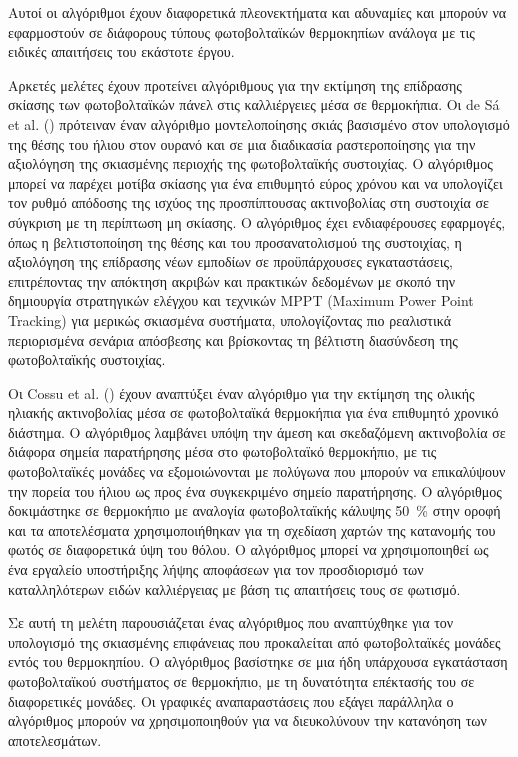 \documentclass[12pt, a4paper]{report} %
\newcommand{\english}{\foreignlanguage{english}}
\begin{document}
\noindent Αυτοί οι αλγόριθμοι έχουν διαφορετικά πλεονεκτήματα και αδυναμίες και μπορούν να εφαρμοστούν σε διάφορους 
τύπους φωτοβολταϊκών θερμοκηπίων ανάλογα με τις ειδικές απαιτήσεις του εκάστοτε έργου.

Αρκετές μελέτες έχουν προτείνει αλγόριθμους για την εκτίμηση της επίδρασης σκίασης των φωτοβολταϊκών πάνελ στις 
καλλιέργειες μέσα σε θερμοκήπια. Οι \english{de Sá et al.} (\citeyear{algorithm_bib9}) πρότειναν έναν αλγόριθμο 
μοντελοποίησης σκιάς βασισμένο στον υπολογισμό της θέσης του ήλιου στον ουρανό και σε μια διαδικασία ραστεροποίησης 
για την αξιολόγηση της σκιασμένης περιοχής της φωτοβολταϊκής συστοιχίας. Ο αλγόριθμος μπορεί να παρέχει μοτίβα 
σκίασης για ένα επιθυμητό εύρος χρόνου και να υπολογίζει τον ρυθμό απόδοσης της ισχύος της προσπίπτουσας ακτινοβολίας 
στη συστοιχία σε σύγκριση με τη περίπτωση μη σκίασης. Ο αλγόριθμος έχει ενδιαφέρουσες εφαρμογές, όπως η βελτιστοποίηση 
της θέσης και του προσανατολισμού της συστοιχίας, η αξιολόγηση της επίδρασης νέων εμποδίων σε προϋπάρχουσες 
εγκαταστάσεις, επιτρέποντας την απόκτηση ακριβών και πρακτικών δεδομένων με σκοπό την δημιουργία στρατηγικών ελέγχου 
και τεχνικών \english{MPPT (Maximum Power Point Tracking)} για μερικώς σκιασμένα συστήματα, υπολογίζοντας πιο ρεαλιστικά 
περιορισμένα σενάρια απόσβεσης και βρίσκοντας τη βέλτιστη διασύνδεση της φωτοβολταϊκής συστοιχίας. 

Οι \english{Cossu et al.} (\citeyear{algorithm_bib11}) έχουν αναπτύξει έναν αλγόριθμο για την εκτίμηση της ολικής 
ηλιακής ακτινοβολίας μέσα σε φωτοβολταϊκά θερμοκήπια για ένα επιθυμητό χρονικό διάστημα. Ο αλγόριθμος λαμβάνει υπόψη 
την άμεση και σκεδαζόμενη ακτινοβολία σε διάφορα σημεία παρατήρησης μέσα στο φωτοβολταϊκό θερμοκήπιο, με τις 
φωτοβολταϊκές μονάδες να εξομοιώνονται με πολύγωνα που μπορούν να επικαλύψουν την πορεία του ήλιου ως προς ένα 
συγκεκριμένο σημείο παρατήρησης. Ο αλγόριθμος δοκιμάστηκε σε θερμοκήπιο με αναλογία φωτοβολταϊκής κάλυψης 
\SI{50}{\percent} στην οροφή και τα αποτελέσματα χρησιμοποιήθηκαν για τη σχεδίαση χαρτών της κατανομής του φωτός σε 
διαφορετικά ύψη του θόλου. Ο αλγόριθμος μπορεί να χρησιμοποιηθεί ως ένα εργαλείο υποστήριξης λήψης αποφάσεων για τον 
προσδιορισμό των καταλληλότερων ειδών καλλιέργειας με βάση τις απαιτήσεις τους σε φωτισμό.

Σε αυτή τη μελέτη παρουσιάζεται ένας αλγόριθμος που αναπτύχθηκε για τον υπολογισμό της σκιασμένης επιφάνειας που 
προκαλείται από φωτοβολταϊκές μονάδες εντός του θερμοκηπίου. Ο αλγόριθμος βασίστηκε σε μια ήδη υπάρχουσα εγκατάσταση 
φωτοβολταϊκού συστήματος σε θερμοκήπιο, με τη δυνατότητα επέκτασής του σε διαφορετικές μονάδες. Οι γραφικές 
αναπαραστάσεις που εξάγει παράλληλα ο αλγόριθμος μπορούν να χρησιμοποιηθούν για να διευκολύνουν την κατανόηση των 
αποτελεσμάτων. 
\end{document}
